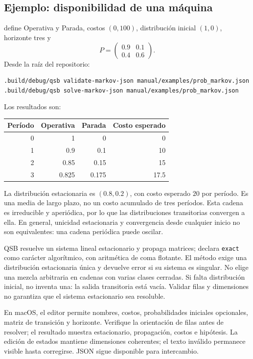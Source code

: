 \subsection{Ejemplo: disponibilidad de una máquina}
 define Operativa y Parada, costos
\((0,100)\), distribución inicial \((1,0)\), horizonte tres y
\[
 P=\begin{pmatrix}0.9&0.1\\0.4&0.6\end{pmatrix}.
\]
Desde la raíz del repositorio:
\begin{lstlisting}
.build/debug/qsb validate-markov-json manual/examples/prob_markov.json
.build/debug/qsb solve-markov-json manual/examples/prob_markov.json
\end{lstlisting}
Los resultados son:
\begin{center}
\begin{tabular}{rrrr}
\toprule
Período & Operativa & Parada & Costo esperado \\
\midrule
0 & 1 & 0 & 0 \\
1 & 0.9 & 0.1 & 10 \\
2 & 0.85 & 0.15 & 15 \\
3 & 0.825 & 0.175 & 17.5 \\
\bottomrule
\end{tabular}
\end{center}
La distribución estacionaria es \((0.8,0.2)\), con costo esperado \(20\)
por período. Es una media de largo plazo, no un costo acumulado de tres períodos.
Esta cadena es irreducible y aperiódica, por lo que las distribuciones transitorias
convergen a ella. En general, unicidad estacionaria y convergencia desde cualquier
inicio no son equivalentes: una cadena periódica puede oscilar.

QSB resuelve un sistema lineal estacionario y propaga matrices; declara
\texttt{exact} como carácter algorítmico, con aritmética de coma flotante.
El método exige una distribución estacionaria única y devuelve error si su
sistema es singular. No elige una mezcla arbitraria en cadenas con varias
clases cerradas. Si falta distribución inicial, no inventa una: la salida
transitoria está vacía. Validar filas y dimensiones no garantiza que el sistema
estacionario sea resoluble.

En macOS, el editor permite nombres, costos, probabilidades iniciales opcionales,
matriz de transición y horizonte. Verifique la orientación de filas antes de
resolver; el resultado muestra estacionario, propagación, costos e hipótesis.
La edición de estados mantiene dimensiones coherentes; el texto inválido
permanece visible hasta corregirse. JSON sigue disponible para intercambio.

